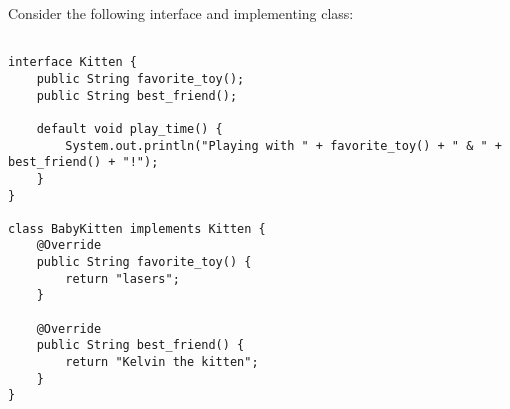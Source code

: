 \question

Consider the following interface and implementing class:

\begin{lstlisting}

interface Kitten {
    public String favorite_toy();
    public String best_friend();
    
    default void play_time() {
        System.out.println("Playing with " + favorite_toy() + " & " + best_friend() + "!");
    }
}

class BabyKitten implements Kitten {
    @Override
    public String favorite_toy() {
        return "lasers";
    }

    @Override
    public String best_friend() {
        return "Kelvin the kitten";
    }
}
\end{lstlisting}

